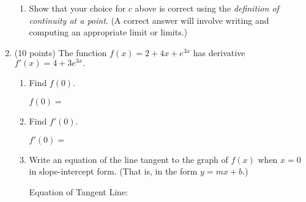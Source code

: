 \documentclass[11pt]{article}
\begin{document}
\begin{enumerate}
\begin{enumerate}
	\item Show that your choice for $c$ above is correct using the \emph{definition of continuity at a point}. (A correct answer will involve writing and computing an appropriate limit or limits.)
\vfill
\vfill
\vfill

\end{enumerate}

\item (10 points) The function $f(x)=2+4x+e^{3x}$ has derivative $f'(x)=4+3e^{3x}.$ 
\begin{enumerate}
\item Find $f(0).$ 

\vfill
\hfill $f(0) = $ \ans %

\bigskip

\item Find $f'(0).$ 
\vfill


\hfill $f'(0) = $ \ans %

\bigskip

\item Write an equation of the line tangent to the graph of $f(x)$ when $x=0$ in slope-intercept form. (That is, in the form $y=mx+b$.) 
\vfill

\hfill Equation of Tangent Line: \ans\ans\ans%

\bigskip

\end{enumerate}
\newpage

%
%
%
%
%
%
%
%


%
%
%


\end{enumerate}
\end{document}
